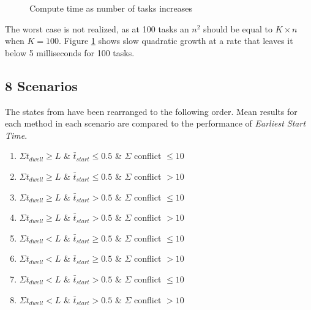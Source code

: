 \documentclass[conference]{IEEEtran}
\begin{document}
\begin{figure}[h]
	\centering
	{}
	\caption{Compute time as number of tasks increases}
	\label{fig:comptimesweep}
\end{figure}

The worst case is not realized, as at 100 tasks an $n^2$ should be equal to $K \times n$ when $K = 100$.
Figure \ref{fig:comptimesweep} shows slow quadratic growth at a rate that leaves it below 5 milliseconds for 100 tasks.

\subsection{8 Scenarios}

The states from \cite{modified_q_learn} have been rearranged to the following order.
Mean results for each method in each scenario are compared to the performance of \emph{Earliest Start Time}.

\begin{enumerate}
	\item $ \Sigma t_{dwell} \ge L $ \& $ \bar{t}_{start} \le 0.5 $ \& $ \Sigma $ conflict $ \le 10$
	\item $ \Sigma t_{dwell} \ge L $ \& $ \bar{t}_{start} \le 0.5 $ \& $ \Sigma $ conflict $ > 10$
	\item $ \Sigma t_{dwell} \ge L $ \& $ \bar{t}_{start} > 0.5 $ \& $ \Sigma $ conflict $ \le 10$
	\item $ \Sigma t_{dwell} \ge L $ \& $ \bar{t}_{start} > 0.5 $ \& $ \Sigma $ conflict $ > 10$
	\item $ \Sigma t_{dwell} < L $ \& $ \bar{t}_{start} \ge 0.5 $ \& $ \Sigma $ conflict $ \le 10$
	\item $ \Sigma t_{dwell} < L $ \& $ \bar{t}_{start} \ge 0.5 $ \& $ \Sigma $ conflict $ > 10$
	\item $ \Sigma t_{dwell} < L $ \& $ \bar{t}_{start} > 0.5 $ \& $ \Sigma $ conflict $ \le 10$
	\item $ \Sigma t_{dwell} < L $ \& $ \bar{t}_{start} > 0.5 $ \& $ \Sigma $ conflict $ > 10$
\end{enumerate}
\end{document}
